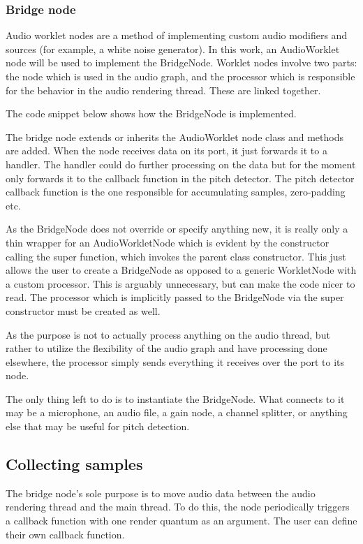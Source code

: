 \subsubsection{Bridge node}
Audio worklet nodes are a method of implementing custom audio modifiers and sources (for example, a white noise generator). In this work, an AudioWorklet node will be used to implement the BridgeNode. Worklet nodes involve two parts: the node which is used in the audio graph, and the processor which is responsible for the behavior in the audio rendering thread. These are linked together.

The code snippet below shows how the BridgeNode is implemented.

The bridge node extends or inherits the AudioWorklet node class and methods are added. When the node receives data on its port, it just forwards it to a handler. The handler could do further processing on the data but for the moment only forwards it to the callback function in the pitch detector. The pitch detector callback function is the one responsible for accumulating samples, zero-padding etc.

As the BridgeNode does not override or specify anything new, it is really only a thin wrapper for an AudioWorkletNode which is evident by the constructor calling the super function, which invokes the parent class constructor. This just allows the user to create a BridgeNode as opposed to a generic WorkletNode with a custom processor. This is arguably unnecessary, but can make the code nicer to read. The processor which is implicitly passed to the BridgeNode via the super constructor must be created as well.



As the purpose is not to actually process anything on the audio thread, but rather to utilize the flexibility of the audio graph and have processing done elsewhere, the processor simply sends everything it receives over the port to its node. 

The only thing left to do is to instantiate the BridgeNode. What connects to it may be a microphone, an audio file, a gain node, a channel splitter, or anything else that may be useful for pitch detection.


\subsection{Collecting samples}
The bridge node's sole purpose is to move audio data between the audio rendering thread and the main thread. To do this, the node periodically triggers a callback function with one render quantum as an argument. The user can define their own callback function.

